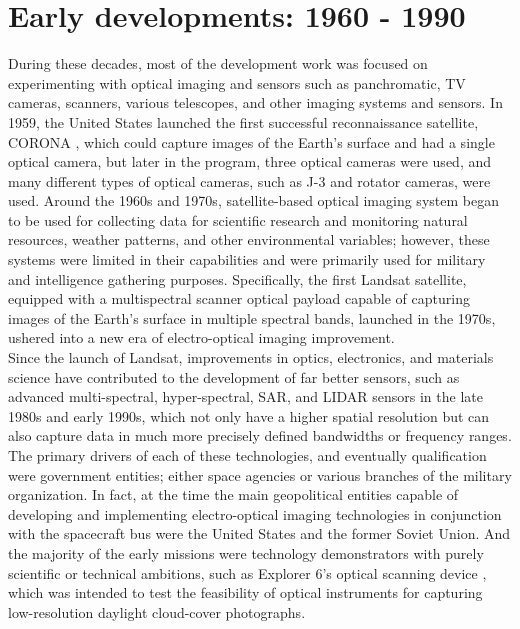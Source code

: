 \documentclass[final,5p,times,sort&compress,twocolumn]{elsarticle}
\begin{document}
\section{Early developments: 1960 - 1990}
\label{Section 2}
During these decades, most of the development work was focused on experimenting with optical imaging and sensors such as panchromatic, TV cameras, scanners, various telescopes, and other imaging systems and sensors. In 1959, the United States launched the first successful reconnaissance satellite, CORONA \cite{ruffner1995corona}, which could capture images of the Earth's surface and had a single optical camera, but later in the program, three optical cameras were used, and many different types of optical cameras, such as J-3 and rotator cameras, were used. 
Around the 1960s and 1970s, satellite-based optical imaging system began to be used for collecting data for scientific research and monitoring natural resources, weather patterns, and other environmental variables; however, these systems were limited in their capabilities and were primarily used for military and intelligence gathering purposes. Specifically, the first Landsat satellite, equipped with a multispectral scanner optical payload capable of capturing images of the Earth's surface in multiple spectral bands, launched in the 1970s, ushered into a new era of electro-optical imaging improvement.\\
Since the launch of Landsat, improvements in optics, electronics, and materials science have contributed to the development of far better sensors, such as advanced multi-spectral, hyper-spectral, SAR, and LIDAR sensors in the late 1980s and early 1990s, which not only have a higher spatial resolution but can also capture data in much more precisely defined bandwidths or frequency ranges\cite{madry2013electro}. The primary drivers of each of these technologies, and eventually qualification were government entities; either space agencies or various branches of the military organization. In fact, at the time the main geopolitical entities capable of developing and implementing electro-optical imaging technologies in conjunction with the spacecraft bus were the United States and the former Soviet Union. And the majority of the early missions were technology demonstrators with purely scientific or technical ambitions, such as Explorer 6's optical scanning device \cite{judge1962observations}, which was intended to test the feasibility of optical instruments for capturing low-resolution daylight cloud-cover photographs. \\
\end{document}
